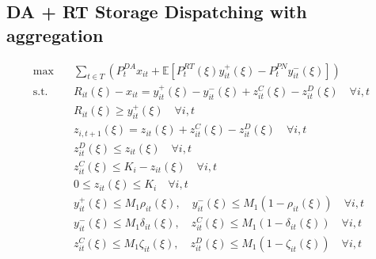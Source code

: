 \documentclass[10pt]{article}
\begin{document}
\subsection{DA + RT Storage Dispatching with aggregation}
\begin{subequations}
    \begin{align}
    \text{max} \quad &\sum_{t\in T}\left(P_t^{DA}x_{it} + \mathbb{E}\left[P_t^{RT}(\xi)y_{it}^{+}(\xi) - P_t^{PN}y_{it}^{-}(\xi)\right]\right)&\\    
    \text{s.t.} \quad &R_{it}(\xi) - x_{it} = y_{it}^{+}(\xi) - y_{it}^{-}(\xi) + z^C_{it}(\xi) - z^D_{it}(\xi)\quad  \forall i, t &\\ 
    &R_{it}(\xi) \geq y^+_{it}(\xi) \quad \forall i ,t &\\
    &z_{i,t+1}(\xi) = z_{it}(\xi) + z^C_{it}(\xi) - z^D_{it}(\xi) \quad \forall i, t &\\
    &z^D_{it}(\xi) \le z_{it}(\xi) \quad \forall i, t &\\
    &z^C_{it}(\xi) \le K_i-z_{it}(\xi) \quad \forall i, t &\\
    &0 \leq z_{it}(\xi) \leq K_i \quad \forall i, t &\\
    &y^+_{it}(\xi) \leq M_1 \rho_{it}(\xi), \quad y^-_{it}(\xi) \leq M_1 (1 - \rho_{it}(\xi)) \quad \forall i, t &\\
    &y^-_{it}(\xi) \leq M_1 \delta_{it}(\xi), \quad z^C_{it}(\xi) \leq M_1 (1 - \delta_{it}(\xi)) \quad \forall i, t &\\
    &z^C_{it}(\xi) \leq M_1 \zeta_{it}(\xi), \quad z^D_{it}(\xi) \leq M_1 (1 - \zeta_{it}(\xi)) \quad \forall i, t &
    \end{align}
\end{subequations}
\end{document}
